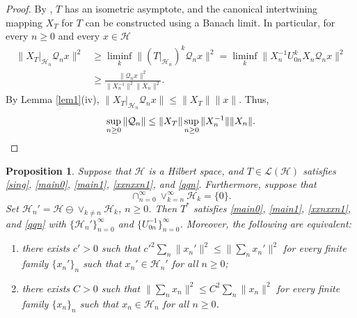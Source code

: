 \documentclass[a4paper,oneside,11pt]{amsart}
\numberwithin{equation}{section}
\theoremstyle{plain}
\newtheorem{proposition}[theorem]{Proposition}
\theoremstyle{definition}
\begin{document}
\begin{proof} By \cite{ker89}, $T$ has an isometric asymptote, and the canonical intertwining mapping $X_T$ for $T$ can 
be constructed using a Banach limit.  
In particular, for every $n\geq 0$ and every  $x\in\mathcal H$ 
\begin{equation*}\begin{aligned}  \|X_T|_{\mathcal H_n}\mathcal Q_nx\|^2&\geq\liminf_k \|(T|_{\mathcal H_n})^k\mathcal Q_nx\|^2=
\liminf_k \|X_n^{-1}U_{0n}^kX_n\mathcal Q_nx\|^2\\&\geq 
\frac{\|\mathcal Q_nx\|^2}{\|X_n^{-1}\|^2\|X_n\|^2}.\end{aligned} \end{equation*} 
By  Lemma \ref{lem1}(iv), 
 $\|X_T|_{\mathcal H_n}\mathcal Q_nx\|\leq\|X_T\|\|x\|$. Thus, 
 $$\sup_{n\geq 0} \|\mathcal Q_n\|\leq\|X_T\|\sup_{n\geq 0} \|X_n^{-1}\|\|X_n\|. \qedhere$$
\end{proof}

\begin{proposition}\label{propstar} Suppose that $\mathcal H$ is a Hilbert space,  and 
  $T\in  \mathcal L(\mathcal H)$ satisfies   \eqref{sing}, \eqref{main0},  \eqref{main1},    \eqref{xxnxxn1}, and  \eqref{qqn}. 
Furthermore, suppose that 
 \begin{equation} \label{cap} \cap_{n=0}^\infty \vee_{k=n}^\infty\mathcal H_k=\{0\}.\end{equation}
Set $\mathcal H_n'=\mathcal H\ominus  \vee_{k\neq n}\mathcal H_k$, $n\geq 0$. 
Then $T^*$ satisfies \eqref{main0},   \eqref{main1},  \eqref{xxnxxn1}, and  \eqref{qqn} with $\{\mathcal H_n'\}_{n=0}^\infty$ 
and $\{U_{0n}^{-1}\}_{n=0}^\infty$. Moreover, the following are equivalent: 
\begin{enumerate}[\upshape (i)]
\item 
there exists $c'>0$ such that $c'^2\sum_n\|x_n'\|^2\leq\|\sum_nx_n'\|^2$
for every finite family $\{x_n'\}_n$  such that $x_n'\in\mathcal H_n'$ for all $n\geq 0$; 
\item 
there exists $C>0$ such that $\|\sum_nx_n\|^2\leq C^2\sum_n\|x_n\|^2$
for every finite family $\{x_n\}_n$  such that $x_n\in\mathcal H_n$ for all $n\geq 0$. \end{enumerate}
\end{proposition}
\end{document}

